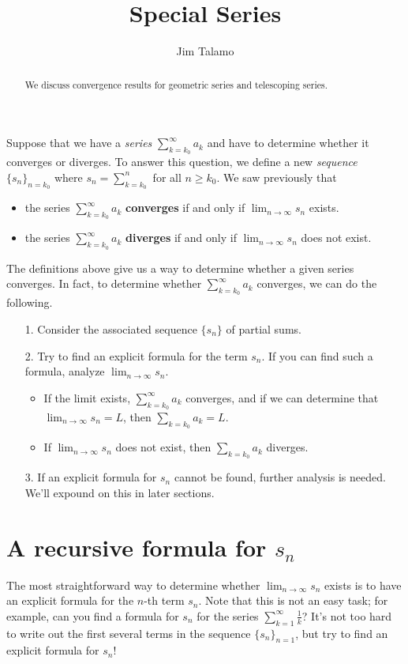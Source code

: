 \documentclass{ximera}
\author{Jim Talamo}
\title[Dig-In:]{Special Series}
\begin{document}
\begin{abstract}
We discuss convergence results for geometric series and telescoping series.
\end{abstract}
\maketitle

Suppose that we have a \emph{series} $\sum_{k=k_0}^{\infty} a_k$ and have to determine whether it converges or diverges.  To answer this question, we define a new \emph{sequence} $\{s_n\}_{n=k_0}$ where $s_n = \sum_{k=k_0}^{n}$ for all $n \geq k_0$.  We saw previously that
 
 \begin{itemize}
\item the series $\sum_{k=k_0}^\infty a_k$ \textbf{converges} if and only if $\lim_{n\to\infty} s_n$ exists.  
\item the series $\sum_{k=k_0}^\infty a_k$ \textbf{diverges} if and only if $\lim_{n\to\infty} s_n$ does not exist.  
\end{itemize}

The definitions above give us a way to determine whether a given series converges.  In fact, to determine whether $\sum_{k=k_0}^{\infty} a_k$ converges, we can do the following.

\begin{itemize}
\item[1.] Consider the associated sequence $\{s_n\}$ of partial sums.
\item[2.] Try to find an explicit formula for the term $s_n$.  If you can find such a formula, analyze $\lim_{n \to \infty} s_n$.  
\begin{itemize}
\item If the limit exists, $\sum_{k=k_0}^{\infty} a_k$ converges, and if we can determine that $\lim_{n \to \infty} s_n =L$, then $\sum_{k=k_0} a_k=L$.  \item If  $\lim_{n \to \infty} s_n$ does not exist, then $\sum_{k=k_0} a_k$ diverges.
\end{itemize}
\item[3.] If an explicit formula for $s_n$ cannot be found, further analysis is needed.  We'll expound on this in later sections.
\end{itemize}


\section{A recursive formula for $s_n$}
The most straightforward way to determine whether $\lim_{n \to \infty} s_n$ exists is to have an explicit formula for the $n$-th term $s_n$.  Note that this is not an easy task; for example, can you find a formula for $s_n$ for the series $\sum_{k=1}^{\infty} \frac{1}{k}$? It's not too hard to write out the first several terms in the sequence $\{s_n\}_{n=1}$, but try to find an explicit formula for $s_n$!
\end{document}
